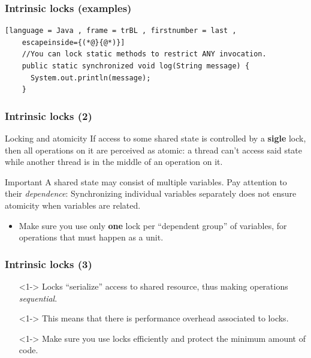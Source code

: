 \documentclass[xcolor={dvipsnames,svgnames},aspectratio=169]{beamer}
\begin{document}
\begin{frame}[fragile]
  \frametitle{Intrinsic locks (examples)}

  \begin{lstlisting}[language = Java , frame = trBL , firstnumber = last ,
    escapeinside={(*@}{@*)}]
    //You can lock static methods to restrict ANY invocation.
    public static synchronized void log(String message) {
      System.out.println(message);
    }
  \end{lstlisting}

\end{frame}

\begin{frame}[fragile]
  \frametitle{Intrinsic locks (2)}
  \begin{block}{Locking and atomicity}
    If access to some shared state is controlled by a \textbf{sigle} lock, then
    all operations on it are perceived as atomic: a thread can't access said
    state while another thread is in the middle of an operation on it.
  \end{block}

  \begin{block}{Important}
    A shared state may consist of multiple variables. Pay attention to their
    \emph{dependence}: Synchronizing individual variables separately does not
    ensure atomicity when variables are related.
  \end{block}

  \begin{itemize}
  \item<2->[\faUserInjured] Make sure you use only \textbf{one} lock per
    ``dependent group'' of variables, for operations that must happen as a unit.
  \end{itemize}
\end{frame}

\begin{frame}[fragile]
  \frametitle{Intrinsic locks (3)}

  \begin{itemize}
  \item[\faBook]<1-> Locks ``serialize'' access to shared resource, thus making
    operations \emph{sequential}.
  \item[\faUserInjured]<1-> This means that there is performance overhead
    associated to locks.
  \item[\faBook]<1-> Make sure you use locks efficiently and protect the minimum
    amount of code.
  \end{itemize}
\end{frame}
\end{document}

